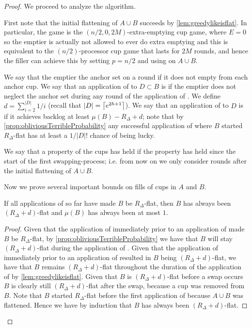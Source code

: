\begin{proof}
We proceed to analyze the algorithm.

First note that the initial flattening of $A\cup B$ succeeds by
\cref{lem:greedylikeisflat}. In particular, the game is the 
$(n/2, 0, 2M)$-extra-emptying cup game, where $E=0$ so the
emptier is actually not allowed to ever do extra emptying and
this is equivalent to the $(n/2)$-processor cup game that lasts
for $2M$ rounds, and hence the filler can achieve this by setting
$p=n/2$ and using \flatalg on $A\cup B$.

We say that the emptier  the anchor set on a round
if it does not empty from each anchor cup. We say that an
application of \randalg to $D\subset B$ is  if
the emptier does not neglect the anchor set during any round of
the application of \randalg. We define $d = \sum_{i=2}^{|D|} 1/i$ (recall
that $|D| = \left\lceil e^{2h+1} \right\rceil$). We say that an application of
\randalg to $D$ is  if it achieves backlog at
least $\mu(B) - R_\Delta + d$; note that by 
\cref{prop:obliviousTerribleProbability} any successful
application of \randalg where $B$ started $R_\Delta$-flat has
at least a $1/|D|!$ chance of being lucky. 

We say that a property of the cups has  held if
the property has held since the start of the first
swapping-process; i.e. from now on we only consider rounds after
the initial flattening of $A\cup B$.

Now we prove several important bounds on fills of cups in $A$ and $B$.
\begin{clm}
  \label{clm:oblivBaseIntenseInduction1}
  If all applications of \flatalg so far have made
  $B$ be $R_\Delta$-flat, then $B$ has always been $(R_\Delta +
  d)$-flat and $\mu(B)$ has always been at most $1$.
\end{clm}
\begin{proof}
  Given that the application of \flatalg immediately prior to an application
  of \randalg made $B$ be $R_\Delta$-flat, by
  \cref{prop:obliviousTerribleProbability} we have that $B$ will
  stay $(R_\Delta + d)$-flat during the application of \randalg. 
  Given that the application of \randalg immediately prior to an
  application of \flatalg resulted in $B$ being $(R_\Delta
  + d)$-flat, we have that $B$ remains $(R_\Delta + d)$-flat
  throughout the duration of the application of \flatalg by
  \cref{lem:greedylikeisflat}. Given that $B$ is $(R_\Delta +
  d)$-flat before a swap occurs $B$ is clearly still $(R_\Delta +
  d)$-flat after the swap, because a cup was removed from $B$.
  Note that $B$ started $R_\Delta$-flat before the first
  application of \flatalg because $A\cup B$ was flattened.
  Hence we have by induction that $B$ has always been $(R_\Delta
  + d)$-flat. 


\end{proof}
\end{proof}
